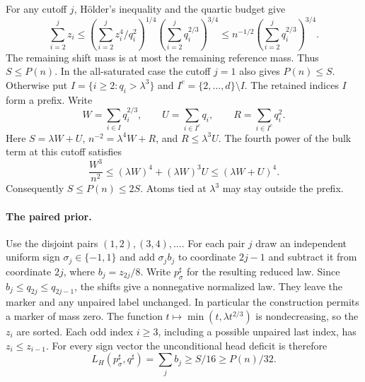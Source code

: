 For any cutoff \(j\), H\"older's inequality and the quartic budget
give
\[
 \sum_{i=2}^{j} z_i
 \le \left(\sum_{i=2}^{j}z_i^4/q_i^2\right)^{1/4}
       \left(\sum_{i=2}^{j}q_i^{2/3}\right)^{3/4}
 \le n^{-1/2}\left(\sum_{i=2}^{j}q_i^{2/3}\right)^{3/4}.
\]
The remaining shift mass is at most the remaining reference mass.
Thus \(S\le P(n)\). In the all-saturated case the cutoff \(j=1\)
also gives \(P(n)\le S\). Otherwise put
\(I=\{i\ge2:q_i>\lambda^3\}\) and
\(I^c=\{2,\ldots,d\}\setminus I\). The retained indices \(I\)
form a prefix. Write
\[
 W=\sum_{i\in I}q_i^{2/3},\qquad
 U=\sum_{i\in I^c}q_i,\qquad R=\sum_{i\in I^c}q_i^2.
\]
Here \(S=\lambda W+U\), \(n^{-2}=\lambda^4W+R\), and
\(R\le\lambda^3 U\). The fourth power of the bulk term at this
cutoff satisfies
\[
 \frac{W^3}{n^2}
 \le (\lambda W)^4+(\lambda W)^3U
 \le (\lambda W+U)^4.
\]
Consequently \(S\le P(n)\le2S\). Atoms tied at
\(\lambda^3\) may stay outside the prefix.

\paragraph{The paired prior.}
Use the disjoint pairs \((1,2),(3,4),\ldots\). For each pair \(j\)
draw an independent uniform sign \(\sigma_j\in\{-1,1\}\) and add
\(\sigma_j b_j\) to coordinate \(2j-1\) and subtract it from
coordinate \(2j\), where \(b_j=z_{2j}/8\). Write \(p_\sigma^\sharp\)
for the resulting reduced law. Since \(b_j\le q_{2j}\le q_{2j-1}\),
the shifts give a nonnegative normalized law. They leave the marker
and any unpaired label unchanged. In particular the construction
permits a marker of mass zero. The function
\(t\mapsto\min(t,\lambda t^{2/3})\) is nondecreasing, so the \(z_i\)
are sorted. Each odd index \(i\ge3\), including a possible unpaired
last index, has \(z_i\le z_{i-1}\). For every sign vector the
unconditional head deficit is therefore
\begin{equation}
 L_H(p_\sigma^\sharp,q^\sharp)=\sum_j b_j
   \ge S/16\ge P(n)/32 .
 \label{eq:signed-head-deficit}
\end{equation}


